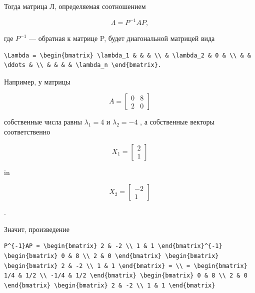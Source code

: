\documentclass[
  ukrainian,
]{article}
\begin{document}
Тогда матрица Л, определяемая соотношением

\[
\Lambda = P^{-1}AP,
\]

где \(P^{-1}\) --- обратная к матрице P, будет диагональной матрицей
вида

\begin{verbatim}
\Lambda = \begin{bmatrix} \lambda_1 & & & \\ & \lambda_2 & 0 & \\ & & \ddots & \\ & & & & \lambda_n \end{bmatrix}.
\end{verbatim}

Например, у матрицы

\[
A = \begin{bmatrix} 0 & 8 \\ 2 & 0 \end{bmatrix}
\]

собственные числа равны \(\lambda_1 = 4\) и \(\lambda_2 = -4\) , а
собственные векторы соответственно

\[
X_1 = \begin{bmatrix} 2 \\ 1 \end{bmatrix}
\]

in

\[
X_2 = \begin{bmatrix} -2 \\ 1 \end{bmatrix}
\]

.

Значит, произведение

\begin{verbatim}
P^{-1}AP = \begin{bmatrix} 2 & -2 \\ 1 & 1 \end{bmatrix}^{-1} \begin{bmatrix} 0 & 8 \\ 2 & 0 \end{bmatrix} \begin{bmatrix} \begin{bmatrix} 2 & -2 \\ 1 & 1 \end{bmatrix} = \\ = \begin{bmatrix} 1/4 & 1/2 \\ -1/4 & 1/2 \end{bmatrix} \begin{bmatrix} 0 & 8 \\ 2 & 0 \end{bmatrix} \begin{bmatrix} 2 & -2 \\ 1 & 1 \end{bmatrix}
\end{verbatim}
\end{document}
